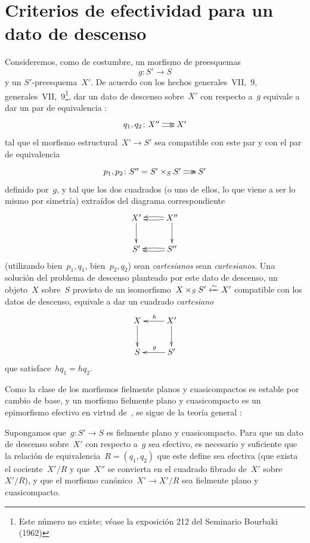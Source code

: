 \section{Criterios de efectividad para un dato de descenso}
\label{VIII.7}

Consideremos, como de costumbre, un morfismo de preesquemas
$$
g\colon S'\to S
$$
y un $S'$-preesquema~$X'$. De acuerdo con los hechos
{generales~VII,~9,}
{generales~VII,~9\footnote{Este número no existe; véase la exposición 212
del Seminario Bourbaki (1962)},}
dar un dato de descenso sobre~$X'$ con respecto a~$g$ equivale a dar un par
de equivalencia \cite{VIII.3}:
$$
\xymatrix@C=.5cm{ q_{1},q_{2}\colon X''\ar@/^2pt/[r]\ar@/_2pt/[r] & X'}
$$
tal que el morfismo estructural~$X'\to S'$ sea compatible con este par y con
el par de equivalencia
$$
\xymatrix@C=.5cm{p_{1},p_{2}\colon
S''=S'\times_{S}S'\ar@/^2pt/[r]\ar@/_2pt/[r] & S'}
$$
definido por~$g$, y tal que los dos cuadrados (o uno de ellos, lo que viene
a ser lo mismo por simetría) extraídos del diagrama correspondiente
$$
\xymatrix{X'\ar[d] & X''\ar@/^2pt/[l]\ar@/_2pt/[l]\ar[d]\\ S' &
S''\ar@/^2pt/[l]\ar@/_2pt/[l]}
$$
(utilizando bien~$p_{1},q_{1}$, bien~$p_{2},q_{2}$)
{sean \emph{cartesianos}}
{sean \emph{cartesianos}}.
Una solución del problema de descenso planteado por este
dato de descenso, \ie un objeto~$X$ sobre~$S$ provisto de un
isomorfismo~$X\times_{S}S'\xleftarrow{\sim} X'$ compatible con los datos de descenso,
equivale a dar un cuadrado \emph{cartesiano}
$$
\xymatrix{X\ar[d] & X'\ar[l]_{h}\ar[d]\\ S & S'\ar[l]_{g}}
$$
que satisface~$hq_{1}=hq_{2}$.

Como
la clase de los morfismos fielmente planos y cuasicompactos es estable por
cambio de base, y un morfismo fielmente plano y cuasicompacto es un
epimorfismo efectivo en virtud de~, se sigue de la teoría
general \cite{VIII.D}:

\begin{proposition}
\label{VIII.7.1}
Supongamos que~$g\colon S'\to S$ es fielmente plano y cuasicompacto. Para que
un dato de descenso sobre~$X'$ con respecto a~$g$ sea efectivo, es necesario
y suficiente que la relación de equivalencia~$R=(q_{1},q_{2})$ que este define
sea efectiva (\ie que exista el cociente~$X'/R$ y que~$X''$ se convierta en
el cuadrado fibrado de~$X'$ sobre~$X'/R$), y que el morfismo
canónico~$X'\to X'/R$ sea fielmente plano y cuasicompacto.
\end{proposition}


